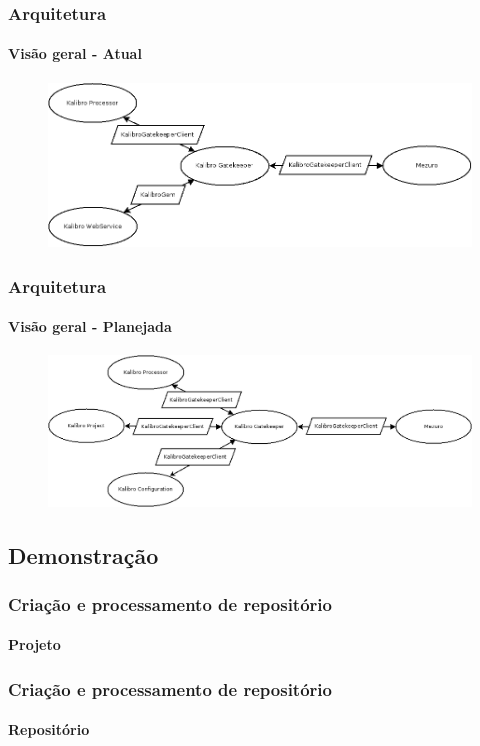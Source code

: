 \documentclass{beamer}
\begin{document}
  \begin{frame}
    \frametitle{Arquitetura}
    \framesubtitle{Visão geral - Atual}

    \begin{figure}[htb]
      \begin{center}
        \includegraphics[scale=0.35]{images/mezuro-architecture-actual.png}
      \end{center}
    \end{figure}
  \end{frame}

  \begin{frame}
    \frametitle{Arquitetura}
    \framesubtitle{Visão geral - Planejada}

    \begin{figure}[htb]
      \begin{center}
        \includegraphics[scale=0.30]{images/mezuro-architecture-predicted.png}
      \end{center}
    \end{figure}
  \end{frame}

  \subsection{Demonstração}
  \begin{frame}
    \frametitle{Criação e processamento de repositório}
    \framesubtitle{Projeto}
  \end{frame}

  \begin{frame}
    \frametitle{Criação e processamento de repositório}
    \framesubtitle{Repositório}
  \end{frame}
\end{document}
